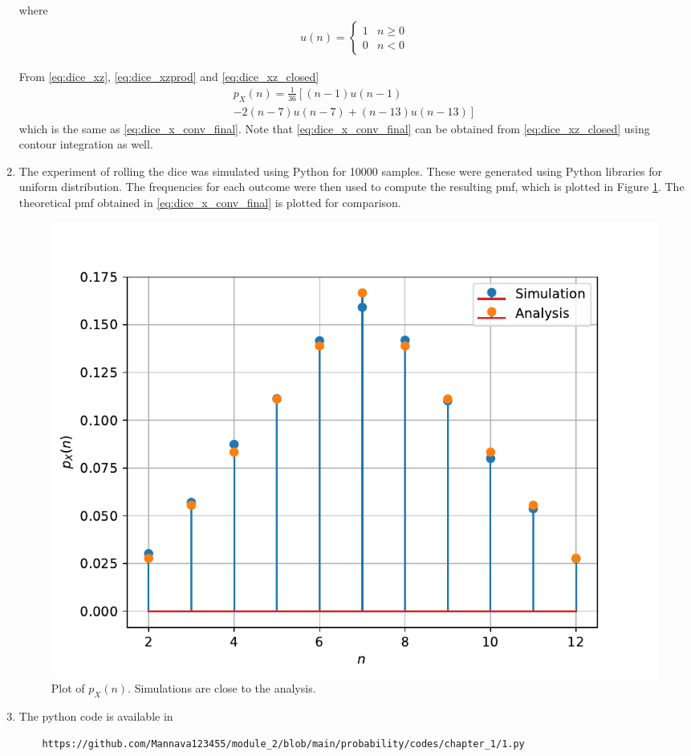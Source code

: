 \documentclass[journal,10pt,twocolumn]{IEEEtran}
\providecommand{\lsbrak}[1]{\ensuremath{{}\left[#1\right.}}
\providecommand{\rsbrak}[1]{\ensuremath{{}\left.#1\right]}}
\providecommand{\brak}[1]{\ensuremath{\left(#1\right)}}
\begin{document}
\begin{enumerate}
where 
\begin{align}
u(n) =
\begin{cases}
1 & n \ge 0
\\
0 & n < 0
\end{cases}
\end{align}

From \eqref{eq:dice_xz}, \eqref{eq:dice_xzprod} and \eqref{eq:dice_xz_closed}
\begin{multline}
p_{X}(n) = \frac{1}{36}\lsbrak{\brak{n-1}u(n-1) 
}
\\
\rsbrak{- 2 \brak{n-7}u(n-7)+\brak{n-13}u(n-13)}
\end{multline}
which is the same as \eqref{eq:dice_x_conv_final}.  Note that  \eqref{eq:dice_x_conv_final} can be obtained from \eqref{eq:dice_xz_closed} using contour integration as well.

\item 
The experiment of rolling the dice was simulated using Python for 10000 samples.  These were generated using Python libraries for uniform distribution. The frequencies for each outcome were then used to compute the resulting pmf, which  is plotted in Figure \ref{fig:dice}.  The theoretical pmf obtained in \eqref{eq:dice_x_conv_final} is plotted for comparison.  
%
\begin{figure}[H]
\centering
\includegraphics[width=\columnwidth]{./pmf_dice.pdf}
\caption{Plot of $p_X(n)$.  Simulations are close to the analysis. }
\label{fig:dice}
\end{figure}
\item The python code is available in 
\begin{lstlisting}
	https://github.com/Mannava123455/module_2/blob/main/probability/codes/chapter_1/1.py
\end{lstlisting}
\end{enumerate}
\end{document}
